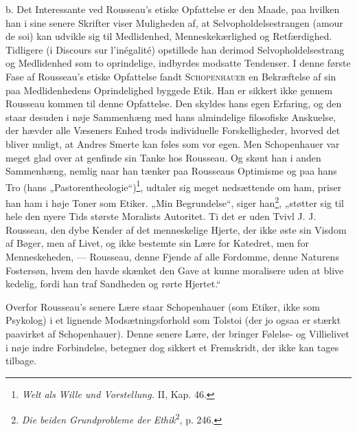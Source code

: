 \documentclass[12pt,a4paper,openany]{book}
\newcommand{\opage}[1]{\marginnote{\footnotesize\textit{[#1]}}}
\begin{document}
b. Det Interessante ved Rousseau’s etiske Opfattelse er
den Maade, paa hvilken han i sine senere Skrifter viser Muligheden
af, at Selvopholdelsestrangen (amour de soi) kan udvikle
sig til Medlidenhed, Menneskekærlighed og Retfærdighed.
Tidligere (i Discours sur l’inégalité) opstillede han derimod
Selvopholdelsestrang og Medlidenhed som to oprindelige, indbyrdes
modsatte Tendenser. I denne første Fase af Rousseau’s
etiske Opfattelse fandt \textsc{Schopenhauer} en Bekræftelse af sin
paa Medlidenhedens Oprindelighed byggede Etik. Han er sikkert
ikke gennem Rousseau kommen til denne Opfattelse. Den
skyldes hans egen Erfaring, og den staar desuden i nøje Sammenhæng
med hans almindelige filosofiske Anskuelse, der hævder
alle Væseners Enhed trods individuelle Forskelligheder,
hvorved det bliver muligt, at Andres Smerte kan føles som vor
egen. Men Schopenhauer var meget glad over at genfinde sin
Tanke hos Rousseau. Og skønt han i anden Sammenhæng,
nemlig naar han tænker paa Rousseaus Optimisme og paa hans
Tro (hans „Pastorentheologie“)\footnote[1]{\textit{Welt als Wille und Vorstellung.} II, Kap. 46.}, udtaler sig meget nedsættende
om ham, priser han ham i høje Toner som Etiker. „Min Begrundelse“,
siger han\footnote[2]{\textit{Die beiden Grundprobleme der Ethik}\textsuperscript{2}, p. 246.}, „støtter sig til hele den nyere Tids
største Moralists Autoritet. Ti det er uden Tvivl J. J. Rousseau,
den dybe Kender af det menneskelige Hjerte, der ikke øste sin
Visdom af Bøger, men af Livet, og ikke bestemte sin Lære for
Katedret, men for Menneskeheden, --- Rousseau, denne Fjende
af alle Fordomme, denne Naturens Fostersøn, hvem den havde
skænket den Gave at kunne moralisere uden at blive kedelig,
fordi han traf Sandheden og rørte Hjertet.“

Overfor Rousseau’s senere Lære staar Schopenhauer (som
Etiker, ikke som Psykolog) i et lignende Modsætningsforhold
som Tolstoi (der jo ogsaa er stærkt paavirket af Schopenhauer).
\setcounter{footnote}{0}%
\opage{133}Denne senere Lære, der bringer Følelse- og Villielivet i nøje
indre Forbindelse, betegner dog sikkert et Fremskridt, der ikke
kan tages tilbage.
\end{document}
